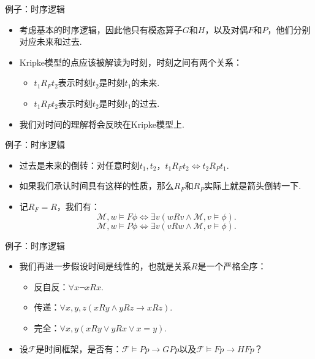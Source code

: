     \begin{frame}{例子：时序逻辑}
    \begin{itemize}
        \item 考虑基本的时序逻辑，因此他只有模态算子$G$和$H$，以及对偶$F$和$P$，他们分别对应未来和过去.
        \item Kripke模型的点应该被解读为时刻，时刻之间有两个关系：
        \begin{itemize}
            \item $t_1 R_F t_2$表示时刻$t_2$是时刻$t_1$的未来.
            \item $t_1 R_P t_2$表示时刻$t_2$是时刻$t_1$的过去.
        \end{itemize}
        \item 我们对时间的理解将会反映在Kripke模型上.
    \end{itemize}
    \end{frame}
    
    \begin{frame}{例子：时序逻辑}
    \begin{itemize}
        \item 过去是未来的倒转：对任意时刻$t_1,t_2$，$t_1 R_F t_2\iff t_2 R_P t_1$.
        \item 如果我们承认时间具有这样的性质，那么$R_F$和$R_P$实际上就是箭头倒转一下.
        \item 记$R_F=R$，我们有：
        \[\mathcal M,w\vDash F\phi\iff\exists v(wRv\wedge\mathcal M,v\vDash \phi).\]
        \[\mathcal M,w\vDash P\phi\iff\exists v(vRw\wedge\mathcal M,v\vDash \phi).\]
    \end{itemize}
    \end{frame}
    
    \begin{frame}{例子：时序逻辑}
    \begin{itemize}
        \item 我们再进一步假设时间是线性的，也就是关系$R$是一个严格全序：
        \begin{itemize}
            \item 反自反：$\forall x\neg xRx$.
            \item 传递：$\forall x,y,z(xRy\wedge yRz\to xRz)$.
            \item 完全：$\forall x,y(xRy\vee yRx\vee x=y)$.
        \end{itemize}
        \item 设$\mathcal F$是时间框架，是否有：$\mathcal F\vDash Pp\to GP p$以及$\mathcal F\vDash Fp\to HF p$？
    \end{itemize}
    \end{frame}
    
